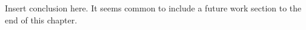 {\color{orange} Insert conclusion here.}
It seems common to include a future work section to the end of this chapter.